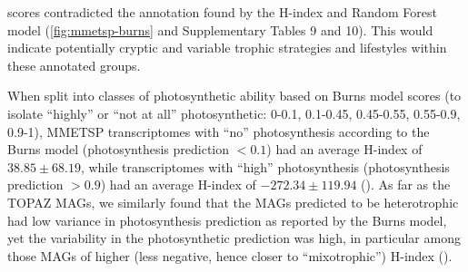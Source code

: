 \documentclass[12pt]{article}
\numberwithin{equation}{section}
\begin{document}
scores contradicted the annotation found by the H-index and Random Forest model (\cref{fig:mmetsp-burns} and Supplementary Tables 9 and 10). This would indicate potentially cryptic and variable trophic strategies and lifestyles within these annotated groups. 

When split into classes of photosynthetic ability based on Burns model scores (to isolate ``highly'' or ``not at all'' photosynthetic: 0-0.1, 0.1-0.45, 0.45-0.55, 0.55-0.9, 0.9-1), MMETSP transcriptomes with ``no'' photosynthesis according to the Burns model (photosynthesis prediction $<0.1$) had an average H-index of $38.85\pm68.19$, while transcriptomes with ``high'' photosynthesis (photosynthesis prediction $>0.9$) had an average H-index of $-272.34\pm119.94$ (). As far as the TOPAZ MAGs, we similarly found that the MAGs predicted to be heterotrophic had low variance in photosynthesis prediction as reported by the Burns model, yet the variability in the photosynthetic prediction was high, in particular among those MAGs of higher (less negative, hence closer to ``mixotrophic'') H-index (). 
\end{document}
